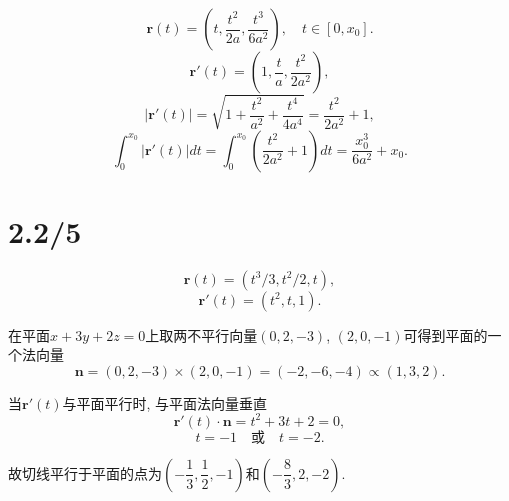 \documentclass[11pt,a4paper]{article}
\begin{document}
$$\mathbf{r}(t)=\left(t,\frac{t^2}{2a},\frac{t^3}{6a^2}\right),
  \quad t\in[0,x_0].$$
$$\mathbf{r}'(t)=\left(1,\frac{t}{a},\frac{t^2}{2a^2}\right),$$
$$|\mathbf{r}'(t)|=\sqrt{1+\frac{t^2}{a^2}+\frac{t^4}{4a^4}}=\frac{t^2}{2a^2}+1,$$
$$\int_0^{x_0}|\mathbf{r}'(t)|dt=\int_0^{x_0}\left(\frac{t^2}{2a^2}+1\right)dt=\frac{x_0^3}{6a^2}+x_0.$$

\section{2.2/5}

$$\mathbf{r}(t)=(t^3/3,t^2/2,t),$$
$$\mathbf{r}'(t)=(t^2,t,1).$$

在平面$x+3y+2z=0$上取两不平行向量$(0,2,-3)$, $(2,0,-1)$可得到平面的一个法向量
$$\mathbf{n}=(0,2,-3)\times(2,0,-1)=(-2,-6,-4)\propto(1,3,2).$$

当$\mathbf{r}'(t)$与平面平行时, 与平面法向量垂直
$$\mathbf{r}'(t)\cdot\mathbf{n}=t^2+3t+2=0,$$
$$t=-1\quad\text{或}\quad t=-2.$$

故切线平行于平面的点为$\left(-\dfrac{1}{3},\dfrac{1}{2},-1\right)$和$\left(-\dfrac{8}{3},2,-2\right)$.
\end{document}
